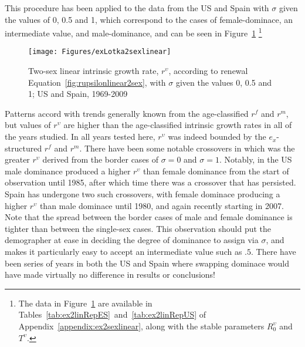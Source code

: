  \FloatBarrier
This procedure has been applied to the data from the US and Spain with $\sigma$
given the values of 0, 0.5 and 1, which correspond to the cases of
female-dominace, an intermediate value, and male-dominance, 
and can be seen in Figure~\ref{fig:rupsilonlinear2sex}
\footnote{The data in Figure~\ref{fig:rupsilonlinear2sex} are available in
    Tables~\ref{tab:ex2linRepES}~and~\ref{tab:ex2linRepUS} of
    Appendix~\ref{appendix:ex2sexlinear}, along with the stable parameters
    $R_0^\upsilon$ and $T^\upsilon$.}

\begin{figure}[!ht]
  \centering
    \caption{Two-sex linear intrinsic growth rate, $r^\upsilon$, according to
    renewal Equation~\eqref{fig:rupsilonlinear2sex}, with $\sigma$ given the
    values 0, 0.5 and 1; US and Spain, 1969-2009}
     \texttt{[image: Figures/exLotka2sexlinear]}
     \label{fig:rupsilonlinear2sex}
\end{figure}

Patterns accord with trends generally known from the age-classified $r^f$ and
$r^m$, but values of $r^\upsilon$ are higher than the
age-classified intrinsic growth rates in all of the years studied. In all years
tested here, $r^\upsilon$ was indeed bounded by the $e_x$-structured $r^f$ and $r^m$. There have been some notable crossovers in
which was the greater $r^\upsilon$ derived from the border cases of $\sigma = 0$
and  $\sigma = 1$. Notably, in the US male dominance produced a higher
$r^\upsilon$ than female dominance from the start of observation until
1985, after which time there was a crossover that has persisted. Spain has
undergone two such crossovers, with female dominace producing a higher
$r^\upsilon$ than male dominace until 1980, and again recently starting in 2007.
Note that the spread between the border cases of male and female dominance is
tighter than between the single-sex cases. This observation should put the
demographer at ease in deciding the degree of dominance to assign via $\sigma$,
and makes it particularly easy to accept an intermediate value such as $.5$.
There have been series of years in both the US and Spain where swapping dominace
would have made virtually no difference in results or conclusions!
